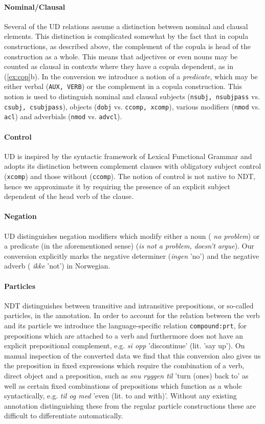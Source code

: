 \documentclass[10pt, a4paper]{article}
\begin{document}
\paragraph{Nominal/Clausal}Several of the UD relations assume a distinction between nominal and
clausal elements. This distinction is complicated somewhat by the fact
that in copula constructions, as described above, the complement of
the copula is head of the construction as a whole. This means that
adjectives or even nouns may be counted as clausal in contexts where
they have a copula dependent, as in (\ref{ex:cop}b).  In the
conversion we introduce a notion of a \emph{predicate}, which may be
either verbal ({\tt AUX, VERB}) or the complement in a copula
construction. This notion is used to distinguish nominal and clausal
subjects ({\tt nsubj, nsubjpass} vs. {\tt csubj, csubjpass}), objects
({\tt dobj} vs. {\tt ccomp, xcomp}), various modifiers ({\tt nmod}
vs. {\tt acl}) and adverbials ({\tt nmod} vs. {\tt advcl}).

\paragraph{Control}UD is inspired by the syntactic framework of Lexical Functional
Grammar \cite{Kap:Bre:82} and adopts its distinction between complement
clauses with obligatory subject control ({\tt xcomp}) and those without
({\tt ccomp}). The notion of control is not native to NDT, hence we
approximate it by requiring the presence of an explicit subject dependent of the
head verb of the clause.


\paragraph{Negation}UD distinguishes negation modifiers which modify either a noun ({\it
  no problem}) or a predicate (in the aforementioned sense) ({\it is
  not a problem, doesn't argue}). Our conversion explicitly marks the
negative determiner ({\it ingen} 'no') and the negative adverb ({\it
  ikke} 'not') in Norwegian.

\paragraph{Particles}NDT distinguishes between transitive and intransitive prepositions, or
so-called particles, in the annotation. In order to account for the
relation between the verb and its particle we introduce the
language-specific relation {\tt compound:prt}, for prepositions which
are attached to a verb and furthermore does not have an explicit prepositional complement,
e.g. {\it si opp} 'discontinue' (lit. 'say up'). 
On manual inspection of the
converted data we find that this conversion also gives us the
preposition in fixed expressions which require the combination of a
verb, direct object and a preposition, such as {\it snu ryggen til}
'turn (ones) back to' as well as certain fixed combinations of
prepositions which function as a whole syntactically, e.g. {\it til og
  med} 'even (lit. to and with)'. Without any existing annotation
distinguishing these from the regular particle constructions these are
difficult to differentiate automatically.
\end{document}
